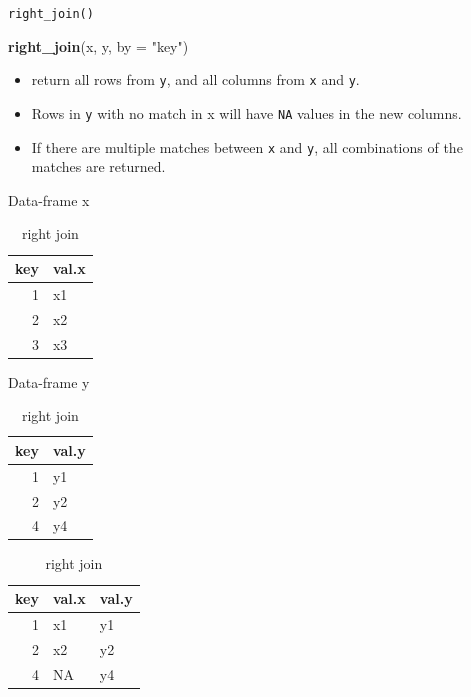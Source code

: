 \documentclass[ignorenonframetext,]{beamer}
\newenvironment{Shaded}{\begin{snugshade}}{\end{snugshade}}
\newcommand{\KeywordTok}[1]{\textcolor[rgb]{0.13,0.29,0.53}{\textbf{#1}}}
\newcommand{\DataTypeTok}[1]{\textcolor[rgb]{0.13,0.29,0.53}{#1}}
\newcommand{\StringTok}[1]{\textcolor[rgb]{0.31,0.60,0.02}{#1}}
\newcommand{\NormalTok}[1]{#1}
\providecommand{\tightlist}{%
  \setlength{\itemsep}{0pt}\setlength{\parskip}{0pt}}
\let\oldShaded\Shaded
\let\endoldShaded\endShaded
\renewenvironment{Shaded}{\footnotesize\oldShaded}{\endoldShaded}
\begin{document}
\begin{frame}[fragile]{\texttt{right\_join()}}

\begin{Shaded}
\begin{Highlighting}[]
\KeywordTok{right_join}\NormalTok{(x, y, }\DataTypeTok{by =} \StringTok{"key"}\NormalTok{)}
\end{Highlighting}
\end{Shaded}

\begin{itemize}
\tightlist
\item
  return all rows from \texttt{y}, and all columns from \texttt{x} and
  \texttt{y}.
\item
  Rows in \texttt{y} with no match in x will have \texttt{NA} values in
  the new columns.
\item
  If there are multiple matches between \texttt{x} and \texttt{y}, all
  combinations of the matches are returned.
\end{itemize}

\begin{table}[!htb]
    \begin{minipage}{.33\linewidth}
      \caption*{Data-frame x}
      \centering 
\begin{tabular}{rl}
\toprule
key & val.x\\
\midrule
1 & x1\\
2 & x2\\
3 & x3\\
\bottomrule
\end{tabular} \end{minipage}%
    \begin{minipage}{.33\linewidth}
      \centering
        \caption*{Data-frame y} 
\begin{tabular}{rl}
\toprule
key & val.y\\
\midrule
1 & y1\\
2 & y2\\
4 & y4\\
\bottomrule
\end{tabular} \end{minipage}%
    \begin{minipage}{.33\linewidth}
      \centering
        \caption*{right join} 
\begin{tabular}{rll}
\toprule
key & val.x & val.y\\
\midrule
1 & x1 & y1\\
2 & x2 & y2\\
4 & NA & y4\\
\bottomrule
\end{tabular} \end{minipage} 
\end{table}

\end{frame}
\end{document}
